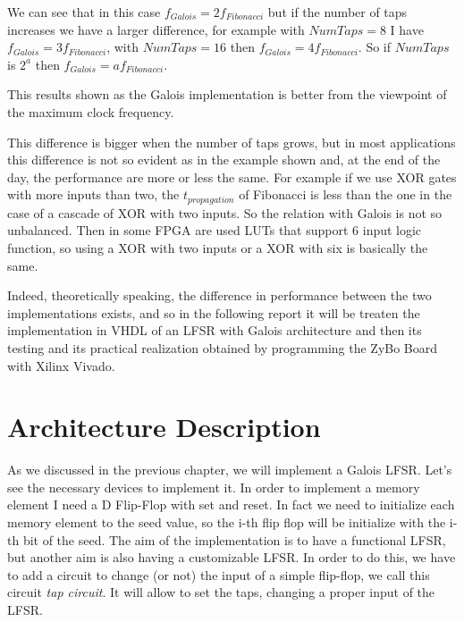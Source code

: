 \documentclass[a4paper]{report}
\begin{document}
\noindent We can see that in this case $f_{Galois}=2f_{Fibonacci}$ but if the number of taps increases we have a larger difference, for example with $NumTaps = 8$ I have $f_{Galois} = 3f_{Fibonacci}$, with $NumTaps=16$ then $f_{Galois} = 4f_{Fibonacci}$. So if $NumTaps$ is $2^a$ then $f_{Galois} = af_{Fibonacci}$.

\noindent This results shown as the Galois implementation is better from the viewpoint of the maximum clock frequency.

\noindent This difference is bigger when the number of taps grows, but in most applications this difference is not so evident as in the example shown and, at the end of the day, the performance are more or less the same. For example if we use XOR gates with more inputs than two, the $t_{propagation}$ of Fibonacci is less than the one in the case of a cascade of XOR with two inputs. So the relation with Galois is not so unbalanced. Then in some FPGA are used LUTs that support 6 input logic function, so using a XOR with two inputs or a XOR with six is basically the same.

\noindent Indeed, theoretically speaking, the difference in performance between the two implementations exists, and so in the following report it will be treaten the implementation in VHDL of an LFSR with Galois architecture and then its testing and its practical realization obtained by programming the ZyBo Board with Xilinx Vivado. 

\chapter{Architecture Description}
As we discussed in the previous chapter, we will implement a Galois LFSR. Let's see the necessary devices to implement it.
In order to implement a memory element I need a D Flip-Flop with set and reset. In fact we need to initialize each memory element to the seed value, so the i-th flip flop will be initialize with the i-th bit of the seed.
The aim of the implementation is to have a functional LFSR, but another aim is also having a customizable LFSR. In order to do this, we have to add a circuit to change (or not) the input of a simple flip-flop, we call this circuit \emph{tap circuit}. It will allow to set the taps, changing a proper input of the LFSR.
\end{document}
